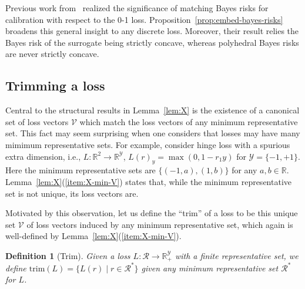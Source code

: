 \documentclass[11pt]{article}
\newcommand{\Comments}{1}
\newcommand{\mynote}[2]{\ifnum\Comments=1\textcolor{#1}{#2}\fi}
\newcommand{\mytodo}[2]{\ifnum\Comments=1%
  \todo[linecolor=#1!80!black,backgroundcolor=#1,bordercolor=#1!80!black]{#2}\fi}
\newcommand{\jessie}[1]{\mynote{teal}{[JF: #1]}}
\newcommand{\btw}[1]{\mytodo{gray!20!white}{BTW: #1}}%
\newcommand{\reals}{\mathbb{R}}
\newcommand{\R}{\mathcal{R}}
\newcommand{\V}{\mathcal{V}}
\newcommand{\Y}{\mathcal{Y}}
\newcommand{\trimcover}{\mathrm{trim}}
\DeclareMathOperator*{\sgn}{sgn}
\newtheorem{definition}{Definition}
\begin{document}


Previous work from~\citet[Proposition 4]{duchi2018multiclass} realized the significance of matching Bayes risks for calibration with respect to the 0-1 loss.
Proposition~\ref{prop:embed-bayes-risks} broadens this general insight to any discrete loss.
Moreover, their result relies the Bayes risk of the surrogate being strictly concave, whereas polyhedral Bayes risks are never strictly concave.

\subsection{Trimming a loss}

Central to the structural results in Lemma~\ref{lem:X} is the existence of a canonical set of loss vectors $\V$ which match the loss vectors of any minimum representative set.
This fact may seem surprising when one considers that losses may have many mimimum representative sets.
For example, consider hinge loss with a spurious extra dimension, i.e., $L:\reals^2\to\reals^\Y$, $L(r)_y = \max(0,1-r_1y)$ for $\Y = \{-1,+1\}$.
Here the minimum representative sets are $\{(-1,a),(1,b)\}$ for any $a,b\in\reals$. 
Lemma~\ref{lem:X}(\ref{item:X-min-V}) states that, while the minimum representative set is not unique, its loss vectors are.

Motivated by this observation, let us define the ``trim'' of a loss to be this unique set $\V$ of loss vectors induced by any minimum representative set, which again is well-defined by Lemma~\ref{lem:X}(\ref{item:X-min-V}).
\begin{definition}[Trim]\label{def:trim-loss}
  Given a loss $L:\R \to \reals_+^\Y$ with a finite representative set, we define $\trimcover(L) = \{L(r) \mid r \in \R^*\}$ given any minimum representative set $\R^*$ for $L$.
\end{definition}
\end{document}
